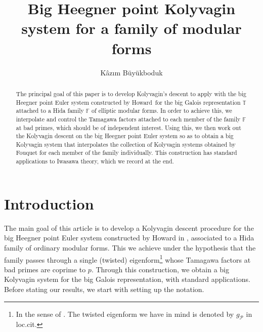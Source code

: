 \documentclass[12pt]{amsart}
\numberwithin{equation}{section}
\begin{document}
\title{{B}\lowercase{ig} {H}\lowercase{eegner point} {K}\lowercase{olyvagin system for a family of modular forms}}

\author{K\^az\i m B\"uy\"ukboduk}

\address{K\^az\i m B\"uy\"ukboduk \hfill\break\indent Ko\c{c} University, Mathematics  \hfill\break\indent Rumeli Feneri Yolu \hfill\break{} Sariyer, Istanbul
\hfill\break\indent Turkey
\hfill\break\indent 
\vskip0.15cm}


\begin{abstract}
The principal goal of this paper is to develop Kolyvagin's descent
to apply with the big Heegner point Euler system constructed by
Howard\,
for the big Galois representation ${\mathbb{T}}$ attached to a Hida family $\mathbb{F}$ of
elliptic modular forms. In order to achieve this,
we interpolate and control the Tamagawa factors attached to each
member of the family $\mathbb{F}$ at bad primes, which should be of
independent interest. Using this, we then work out the Kolyvagin
descent on the big Heegner point Euler system so as to obtain a big Kolyvagin system that interpolates the collection of Kolyvagin systems obtained by Fouquet for each member of the family individually. This construction has standard applications to Iwasawa theory, which we record at the end.
\end{abstract}

\maketitle
\section{Introduction}
\label{sec:intro} The main goal of this article is to develop a Kolyvagin descent
procedure for the big Heegner point Euler system constructed by
Howard in \cite{howard}, associated to a Hida family of ordinary
modular forms. This we achieve under the hypothesis that the family
passes through a single (twisted) eigenform\footnote{In the sense of \cite[\S12.7.10]{nek}. The twisted eigenform we have in mind is denoted by $g_{\mathcal{P}}$ in loc.cit.} whose Tamagawa factors at bad
primes are coprime to $p$. Through this construction, we obtain a
big Kolyvagin system for the big Galois representation, with
standard applications. Before stating our results, we start with
setting up the notation.
\end{document}
